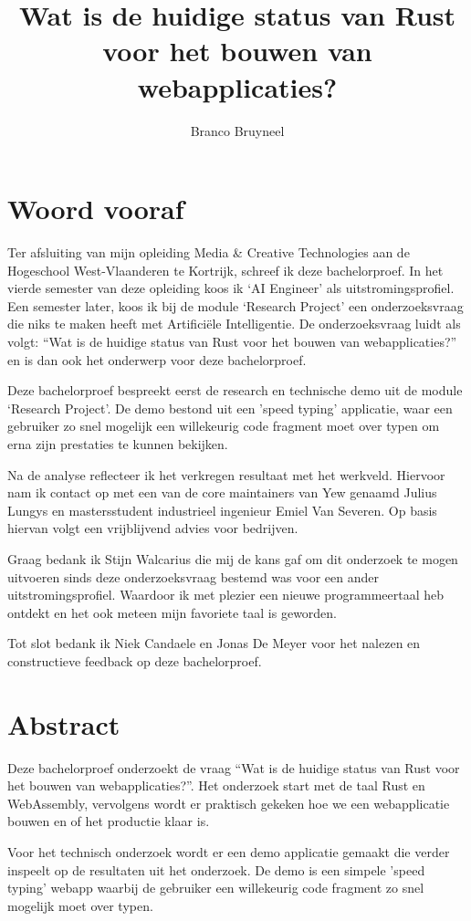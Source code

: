 \documentclass[11pt,a4paper,oneside]{book}
\author{Branco Bruyneel}
\title{Wat is de huidige status van Rust voor het bouwen van webapplicaties?}
\begin{document}
\maketitle

\chapter*{Woord vooraf}
Ter afsluiting van mijn opleiding Media \& Creative Technologies aan de Hogeschool West-Vlaanderen
te Kortrijk, schreef ik deze bachelorproef.  In het vierde semester van deze opleiding koos ik ‘AI
Engineer’ als uitstromingsprofiel. Een semester later, koos ik bij de module ‘Research Project’ een
onderzoeksvraag die niks te maken heeft met Artificiële Intelligentie. De onderzoeksvraag luidt als
volgt: \enquote{Wat is de huidige status van Rust voor het bouwen van webapplicaties?} en is dan ook
het onderwerp voor deze bachelorproef. 

Deze bachelorproef bespreekt eerst de research en technische demo uit de module ‘Research Project’.
De demo bestond uit een 'speed typing' applicatie, waar een gebruiker zo snel mogelijk een
willekeurig code fragment moet over typen om erna zijn prestaties te kunnen bekijken. 

Na de analyse reflecteer ik het verkregen resultaat met het werkveld. Hiervoor nam ik contact op met
een van de core maintainers van Yew genaamd Julius Lungys en mastersstudent industrieel ingenieur
Emiel Van Severen. Op basis hiervan volgt een vrijblijvend advies voor bedrijven. 

Graag bedank ik Stijn Walcarius die mij de kans gaf om dit onderzoek te mogen uitvoeren sinds deze
onderzoeksvraag bestemd was voor een ander uitstromingsprofiel. Waardoor ik met plezier een nieuwe
programmeertaal heb ontdekt en het ook meteen mijn favoriete taal is geworden. 

Tot slot bedank ik Niek Candaele en Jonas De Meyer voor het nalezen en constructieve feedback op
deze bachelorproef.

\chapter*{Abstract}
Deze bachelorproef onderzoekt de vraag \enquote{Wat is de huidige status van Rust voor het bouwen
van webapplicaties?}. Het onderzoek start met de taal Rust en WebAssembly, vervolgens wordt er 
praktisch gekeken hoe we een webapplicatie bouwen en of het productie klaar is.

Voor het technisch onderzoek wordt er een demo applicatie gemaakt die verder inspeelt op de
resultaten uit het onderzoek. De demo is een simpele 'speed typing' webapp waarbij de gebruiker een
willekeurig code fragment zo snel mogelijk moet over typen.
\end{document}
